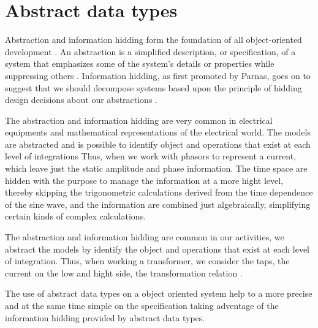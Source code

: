 \section{Abstract data types}

Abstraction and information hidding form 
the foundation of all object-oriented 
development \cite{Levy:1984}. 
An abstraction is a simplified description, 
or specification, of a system that emphasizes 
some of the system's details or properties while
suppressing others \cite{Shaw:1984}.
Information hidding, as first promoted by Parnas,
goes on to suggest that we should decompose 
systems based upon the principle of hidding 
design decisions about our 
abstractions \cite{Parnas:1979} \cite{Grady:1995}.

The abstraction and information hidding 
are very common in electrical equipments and 
mathematical representations of the 
electrical world. The 
models are abstracted 
and is possible to identify object and 
operations that exist at each level of integrations 
Thus, 
when  we work 
with phasors to represent a current, which 
leave just the static amplitude and phase
information. The time space are hidden with 
the purpose to manage the information 
at a more hight level, 
thereby skipping the trigonometric calculations 
derived from the time dependence of the sine wave, 
and the information are combined just algebraically, 
simplifying certain kinds of complex 
calculations.  \cite{Grady:1995}

The abstraction  and information hidding are common 
in our activities, we abstract the models by 
identify the object and operations that exist 
at each level of integration. Thus, when
\cite[inline]{ver si las palabras estan 
bien escritas en este ejemplo} 
working a transformer, we consider the 
taps, the current on the low and hight side, 
the transformation relation \cite{Grady:1995}.

The use of abstract data types on a object oriented system 
help to a more precise and at the same time simple on the 
specification taking adventage of the information hidding 
provided by abstract 
data types. \cite{} 




